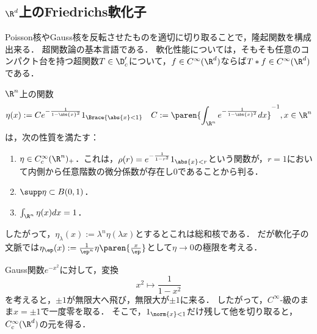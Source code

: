\documentclass[uplatex,dvipdfmx]{jsreport}
\begin{document}
\subsection{$\R^d$上のFriedrichs軟化子}

\begin{tcolorbox}[colframe=ForestGreen, colback=ForestGreen!10!white,breakable,colbacktitle=ForestGreen!40!white,coltitle=black,fonttitle=\bfseries\sffamily,
title=]
    Poisson核やGauss核を反転させたものを適切に切り取ることで，隆起関数を構成出来る．
    超関数論の基本言語である．
    軟化性能については，そもそも任意のコンパクト台を持つ超関数$T\in\D'_c$について，$f\in C^\infty(\R^d)$ならば$T*f\in C^\infty(\R^d)$である．
\end{tcolorbox}

\begin{example}[総和核としてのFriedrichs軟化子]
    $\R^n$上の関数
    \[\eta(x):=Ce^{-\frac{1}{1-\abs{x}^2}}1_{\Brace{\abs{x}<1}}\quad C:=\paren{\int_{\R^n} e^{-\frac{1}{1-\abs{x}^2}}dx}^{-1},x\in\R^n\]
    は，次の性質を満たす：
    \begin{enumerate}
        \item $\eta\in C_c^\infty(\R^n)_+$．これは，$\rho(r)=e^{-\frac{1}{1-r^2}}1_{\abs{x}<r}$という関数が，$r=1$において内側から任意階数の微分係数が存在し$0$であることから判る．
        \item $\supp \eta\subset B(0,1)$．
        \item $\int_{\R^n}\eta(x)dx=1$．
    \end{enumerate}
    したがって，$\eta_\lambda(x):=\lambda^n\eta(\lambda x)$とするとこれは総和核である．
    だが軟化子の文脈では$\eta_\ep(x):=\frac{1}{\ep^n}\eta\paren{\frac{x}{\ep}}$として$\eta\to0$の極限を考える．
\end{example}
\begin{remarks}[Gauss核の変換としての隆起関数]\label{remarks-transformed-Gauss-kernel}
    Gauss関数$e^{-x^2}$に対して，変換
    \[x^2\mapsto\frac{1}{1-x^2}\]
    を考えると，$\pm1$が無限大へ飛び，無限大が$\pm1$に来る．
    したがって，$C^\infty$-級のまま$x=\pm1$で一度零を取る．
    そこで，$1_{\norm{x}<1}$だけ残して他を切り取ると，$C_c^\infty(\R^d)$の元を得る．
\end{remarks}
\end{document}
